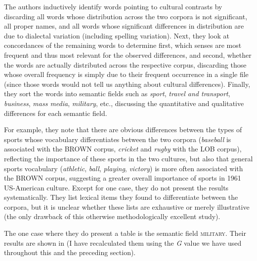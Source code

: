 The authors inductively  identify words pointing to cultural  contrasts by discarding all words whose distribution  across the two corpora is not significant, all proper names, and all words whose significant differences in distribution are due to dialectal variation  (including spelling variation). Next, they look at concordances  of the remaining words to determine first, which senses are most frequent and thus most relevant for the observed differences, and second, whether the words are actually distributed  across the respective corpus, discarding those whose overall frequency  is simply due to their frequent occurrence in a single file (since those words would not tell us anything about cultural  differences). Finally, they sort the words into semantic  fields such as \textit{sport}, \textit{travel and transport}, \textit{business}, \textit{mass media}, \textit{military}, etc., discussing the quantitative  and qualitative  differences for each semantic field.

For example, they note that there are obvious differences between the types of sports whose vocabulary differentiates between the two corpora (\textit{baseball} is associated  with the BROWN  corpus, \textit{cricket} and \textit{rugby} with the LOB  corpus), reflecting the importance of these sports in the two cultures,  but also that general sports vocabulary (\textit{athletic}, \textit{ball}, \textit{playing}, \textit{victory}) is more often associated  with the BROWN  corpus, suggesting a greater overall importance of sports in 1961 US\hyp{}American  culture.  Except for one case, they do not present the results systematically. They list lexical items they found to differentiate between the corpora, but it is unclear whether these lists are exhaustive or merely illustrative (the only drawback of this otherwise methodologically excellent study).

The one case where they do present a table is the semantic  field \textsc{military}. Their results are shown in  (I have recalculated them using the \emph{G}  value we have used throughout this and the preceding section).

